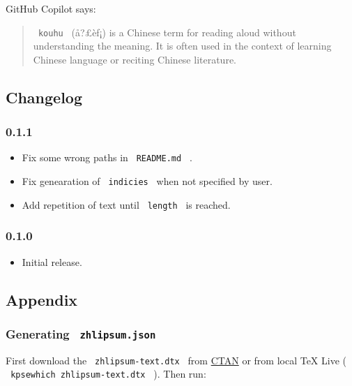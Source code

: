 GitHub Copilot says:

\begin{quote}
\texttt{\ kouhu\ } (å?£èƒ¡) is a Chinese term for reading aloud without
understanding the meaning. It is often used in the context of learning
Chinese language or reciting Chinese literature.
\end{quote}

\subsection{Changelog}\label{changelog}

\subsubsection{0.1.1}\label{section}

\begin{itemize}
\tightlist
\item
  Fix some wrong paths in \texttt{\ README.md\ } .
\item
  Fix genearation of \texttt{\ indicies\ } when not specified by user.
\item
  Add repetition of text until \texttt{\ length\ } is reached.
\end{itemize}

\subsubsection{0.1.0}\label{section-1}

\begin{itemize}
\tightlist
\item
  Initial release.
\end{itemize}

\subsection{Appendix}\label{appendix}

\subsubsection{\texorpdfstring{Generating
\texttt{\ zhlipsum.json\ }}{Generating  zhlipsum.json }}\label{generating-zhlipsum.json}

First download the \texttt{\ zhlipsum-text.dtx\ } from
\href{https://ctan.org/pkg/zhlipsum}{CTAN} or from local TeX Live (
\texttt{\ kpsewhich\ zhlipsum-text.dtx\ } ). Then run:


